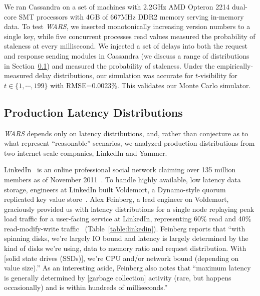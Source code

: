 \documentclass{vldb}
\begin{document}
We ran Cassandra on a set of machines with 2.2GHz AMD Opteron 2214
dual-core SMT processors with 4GB of 667MHz DDR2 memory serving
in-memory data.  To test \textit{WARS}, we inserted monotonically
increasing version numbers to a single key, while five concurrent
processes read values measured the probability of staleness at every
millisecond.  We injected a set of delays into both the request and
response sending modules in Cassandra (we discuss a range of
distributions in Section~\ref{sec:latencies}) and measured the
probability of staleness.  Under the empirically-measured delay
distributions, our simulation was accurate for $t$-visibility for
$t\in\{1,\cdots,199\}$ with RMSE=0.0023\%.  This validates our Monte
Carlo simulator.

\subsection{Production Latency Distributions}
\label{sec:latencies}

\textit{WARS} depends only on latency distributions, and, rather than
conjecture as to what represent ``reasonable'' scenarios, we analyzed
production distributions from two internet-scale companies, LinkedIn
and Yammer.

LinkedIn~\cite{linkedin} is an online professional social network
claiming over 135 million members as of November
2011~\cite{linkedinmembers}. To handle highly available, low latency
data storage, engineers at LinkedIn built Voldemort, a Dynamo-style
quorum replicated key value store~\cite{voldemort, voldemortpub}.
Alex Feinberg, a lead engineer on Voldemort, graciously provided us
with latency distributions for a single node replaying peak load
traffic for a user-facing service at LinkedIn, representing 60\% read
and 40\% read-modify-write traffic~\cite{feinbergpc}
(Table~\ref{table:linkedin}).  Feinberg reports that ``with spinning
disks, we're largely IO bound and latency is largely determined by the
kind of disks we're using, data to memory ratio and request
distribution.  With [solid state drives (SSDs)], we're CPU and/or
network bound (depending on value size).''  As an interesting aside,
Feinberg also notes that ``maximum latency is generally determined by
[garbage collection] activity (rare, but happens occasionally) and is
within hundreds of milliseconds.''
\end{document}
